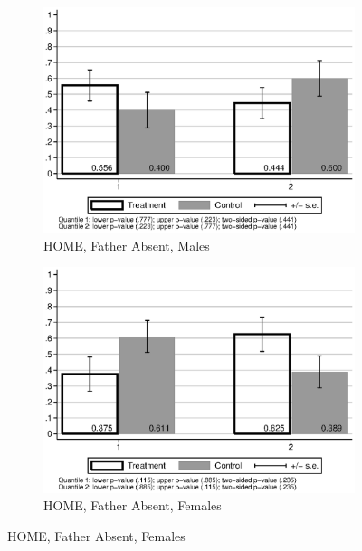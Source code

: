 \begin{figure}
\begin{center}
\caption{Factor HOME Scores}
\label{fig:total-home-quantiles}
	\begin{subfigure}[b]{0.49\textwidth}
		\centering
		\caption{HOME, Father Absent, Males}
		\label{fig:home-male-mean}
			\includegraphics[width=\textwidth]{../output/HOME-male1-fhome0-2quant}
	\end{subfigure}
	\begin{subfigure}[b]{0.49\textwidth}
		\centering
		\caption{HOME, Father Absent, Females}
		\label{fig:home-female-mean}
			\includegraphics[width=\textwidth]{../output/HOME-male0-fhome0-2quant}
	\end{subfigure}
	

\end{center}
\end{figure}
